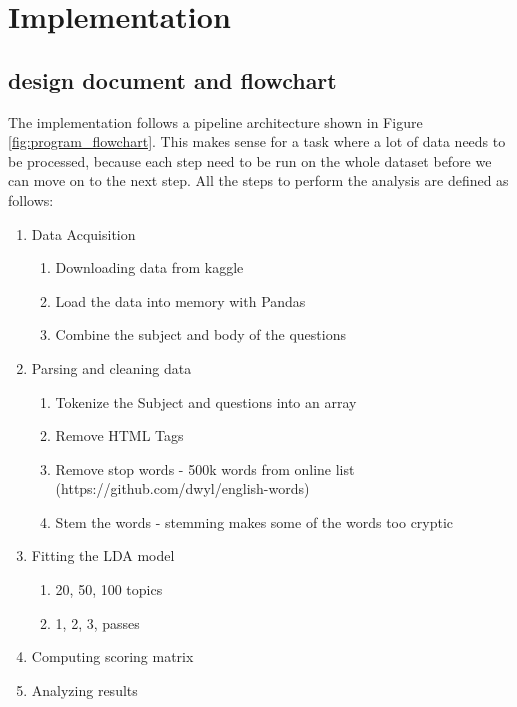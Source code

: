\section{Implementation}


\subsection{design document and flowchart}

The implementation follows a pipeline architecture shown in Figure \ref{fig:program_flowchart}. This makes sense for a task where a lot of data needs to be processed, because each step need to be run on the whole dataset before we can move on to the next step. All the steps to perform the analysis are defined as follows: 

 \begin{enumerate}
	\item Data Acquisition
	\begin{enumerate}
		\item Downloading data from kaggle
		\item Load the data into memory with Pandas
		\item Combine the subject and body of the questions
	\end{enumerate}
	\item Parsing and cleaning data	
		\begin{enumerate}
			\item Tokenize the Subject and questions into an array
			\item Remove HTML Tags
			\item Remove stop words - 500k words from online list (https://github.com/dwyl/english-words)
			\item Stem the words - stemming makes some of the words too cryptic			
		\end{enumerate}	
	\item Fitting the LDA model
		\begin{enumerate}
			\item 20, 50, 100 topics
			\item 1, 2, 3, passes
		\end{enumerate}		
	\item Computing scoring matrix	
	\item Analyzing results


\end{enumerate}





